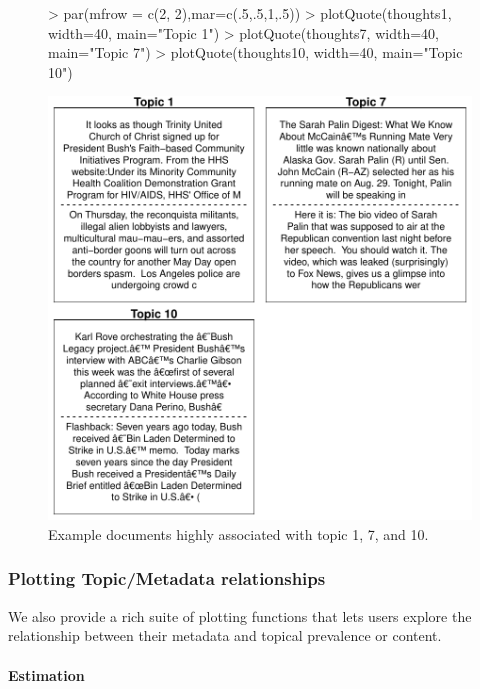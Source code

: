 \documentclass[nojss]{jss}
\begin{document}
\begin{figure}[t!]
\begin{center}
\begin{Schunk}
\begin{Sinput}
> par(mfrow = c(2, 2),mar=c(.5,.5,1,.5))
> plotQuote(thoughts1, width=40, main="Topic 1")
> plotQuote(thoughts7, width=40, main="Topic 7")
> plotQuote(thoughts10, width=40, main="Topic 10")
\end{Sinput}
\end{Schunk}
\includegraphics{stmVignette-011}
\caption{Example documents highly associated with topic 1, 7, and 10.}
\label{fig:example}
\end{center}
\end{figure}



\subsubsection{Plotting Topic/Metadata relationships}
We also provide a rich suite of plotting functions that lets users explore the relationship between their metadata and topical prevalence or content.

\paragraph{Estimation}
\end{document}
